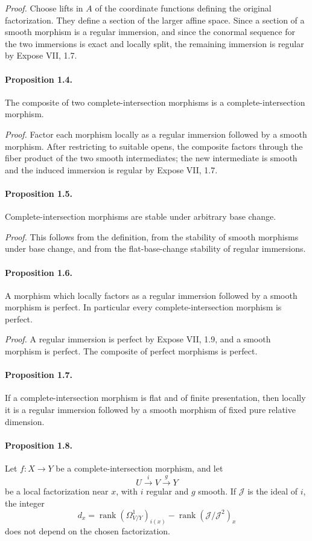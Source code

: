 \documentclass[12pt]{article}
\newcommand{\cJ}{\mathcal J}
\newcommand{\rank}{\operatorname{rank}}
\newcommand{\xto}[1]{\xrightarrow{#1}}
\begin{document}
\emph{Proof.} Choose lifts in $A$ of the coordinate functions defining the original factorization. They define a section of the larger affine space. Since a section of a smooth morphism is a regular immersion, and since the conormal sequence for the two immersions is exact and locally split, the remaining immersion is regular by Expose VII, 1.7.

\paragraph{Proposition 1.4.} The composite of two complete-intersection morphisms is a complete-intersection morphism.

\emph{Proof.} Factor each morphism locally as a regular immersion followed by a smooth morphism. After restricting to suitable opens, the composite factors through the fiber product of the two smooth intermediates; the new intermediate is smooth and the induced immersion is regular by Expose VII, 1.7.

\paragraph{Proposition 1.5.} Complete-intersection morphisms are stable under arbitrary base change.

\emph{Proof.} This follows from the definition, from the stability of smooth morphisms under base change, and from the flat-base-change stability of regular immersions.

\paragraph{Proposition 1.6.} A morphism which locally factors as a regular immersion followed by a smooth morphism is perfect. In particular every complete-intersection morphism is perfect.

\emph{Proof.} A regular immersion is perfect by Expose VII, 1.9, and a smooth morphism is perfect. The composite of perfect morphisms is perfect.

\paragraph{Proposition 1.7.} If a complete-intersection morphism is flat and of finite presentation, then locally it is a regular immersion followed by a smooth morphism of fixed pure relative dimension.

\paragraph{Proposition 1.8.} Let $f:X\to Y$ be a complete-intersection morphism, and let
\[
U\xto{i}V\xto{g}Y
\]
be a local factorization near $x$, with $i$ regular and $g$ smooth. If $\cJ$ is the ideal of $i$, the integer
\[
d_x=\rank(\Omega^1_{V/Y})_{i(x)}-\rank(\cJ/\cJ^2)_x
\]
does not depend on the chosen factorization.
\end{document}
